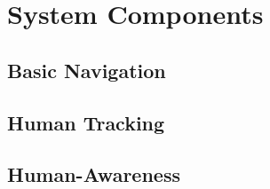 \section{System Components}
\label{sec:system}


\subsection{Basic Navigation}


\subsection{Human Tracking}


\subsection{Human-Awareness}

